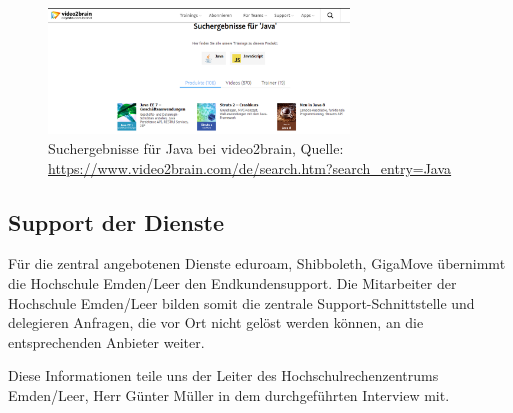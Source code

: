\begin{figure}[h!]
	\centering
	\includegraphics[width=8cm]{kapitel/gruppe2/bilder/video2brain_suche}
	\caption{Suchergebnisse für Java bei video2brain, Quelle: \url{https://www.video2brain.com/de/search.htm?search_entry=Java}}
	\label{fig_video2brain_suchergebnis}
\end{figure}

\subsection{Support der Dienste}
Für die zentral angebotenen Dienste eduroam, Shibboleth, GigaMove übernimmt die Hochschule Emden/Leer den Endkundensupport. Die Mitarbeiter der Hochschule Emden/Leer bilden somit die zentrale Support-Schnittstelle und delegieren Anfragen, die vor Ort nicht gelöst werden können, an die entsprechenden Anbieter weiter.

Diese Informationen teile uns der Leiter des Hochschulrechenzentrums Emden/Leer, Herr Günter Müller in dem durchgeführten Interview mit.